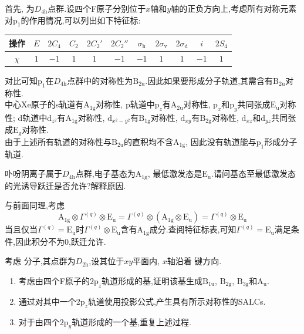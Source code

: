 \documentclass{ctexart}
\begin{document}
\begin{solution}
    首先, 为$D_{4\text{h}}$点群.设四个F原子分别位于$x$轴和$y$轴的正负方向上,考虑所有对称元素对$\text{p}_1$的作用情况,可以列出如下特征标:
    \begin{table}[H]\centering
        \begin{tabular}{|c|c|c|c|c|c|c|c|c|c|c|}\hline
            操作 & $E$ & $2C_4$ & $C_2$ & $2C_2'$ & $2C_2''$ & $\sigma_\text{h}$ & $2\sigma_\text{v}$ & $2\sigma_\text{d}$ & $i$ & $2S_4$ \\\hline
            $\chi$ & $1$ & $-1$ & $1$ & $1$ & $-1$ & $-1$ & $1$ & $1$ & $-1$ & $1$ \\\hline
        \end{tabular}
    \end{table}
    对比可知$\text{p}_1$在$D_{4\text{h}}$点群中的对称性为$\text{B}_{2\text{u}}$.因此如果要形成分子轨道,其需含有$\text{B}_{2\text{u}}$对称性.\\
    \indent 中心Xe原子的s轨道有$\text{A}_{1\text{g}}$对称性, p轨道中$\text{p}_z$有$\text{A}_{2\text{u}}$对称性, $\text{p}_x$和$\text{p}_y$共同张成$\text{E}_{\text{u}}$对称性; d轨道中$\text{d}_{z^2}$有$\text{A}_{1\text{g}}$对称性, $\text{d}_{x^2-y^2}$有$\text{B}_{1\text{g}}$对称性, $\text{d}_{xy}$有$\text{B}_{2\text{g}}$对称性, $\text{d}_{xz}$和$\text{d}_{yz}$共同张成$\text{E}_{\text{g}}$对称性.\\
    \indent 由于上述所有轨道的对称性与$\text{B}_{2\text{u}}$的直积均不含$\text{A}_{1\text{g}}$, 因此没有轨道能与$\text{p}_1$形成分子轨道.
\end{solution}
\begin{homework}[14.]
    卟吩阴离子属于$D_{4\text{h}}$点群,电子基态为$\text{A}_{1\text{g}}$, 最低激发态是$\text{E}_{\text{u}}$.请问基态至最低激发态的光诱导跃迁是否允许?解释原因.
\end{homework}
\begin{solution}
    与前面同理,考虑
    \[\text{A}_{1\text{g}}\otimes\Gamma^{(q)}\otimes\text{E}_{\text{u}}=\Gamma^{(q)}\otimes(\text{A}_{1\text{g}}\otimes\text{E}_{\text{u}})=\Gamma^{(q)}\otimes\text{E}_\text{u}\]
    当且仅当$\Gamma^{(q)}=\text{E}_{\text{u}}$时$\Gamma^{(q)}\otimes\text{E}_\text{u}$含有$\text{A}_{1\text{g}}$成分.查阅特征标表,可知$\Gamma^{(q)}=\text{E}_{\text{u}}$满足条件,因此积分不为$0$,跃迁允许.
\end{solution}
\begin{homework}[15.]
    考虑 分子,其点群为$D_{2\text{h}}$,设其位于$xy$平面内, $x$轴沿着 键方向.
    \begin{enumerate}[label=\tbf{(\alph*)}]
        \item 考虑由四个F原子的$2\text{p}_z$轨道形成的基,证明该基生成$\text{B}_{1\text{u}}$, $\text{B}_{2\text{g}}$, $\text{B}_{3\text{g}}$和$\text{A}_{\text{u}}$.
        \item 通过对其中一个$2\text{p}_z$轨道使用投影公式,产生具有所示对称性的SALCs.
        \item 对于由四个$2\text{p}_y$轨道形成的一个基,重复上述过程.
    \end{enumerate}
\end{homework}
\end{document}
